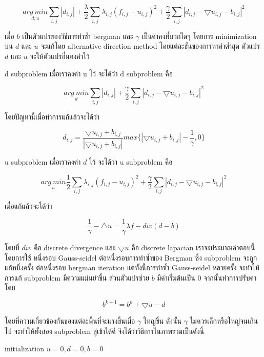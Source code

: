 \documentclass[hidelinks,a4paper,14pt]{article}
\numberwithin{equation}{section}							%
\begin{document}
{		$$\underset{d , u}{arg \ min}\sum_{i,j}|d_{i,j}|+\frac{\lambda}{2}\sum_{i,j}\lambda_{i,j}(f_{i,j} - u_{i,j})^2 + \frac{\gamma}{2} \sum_{i,j} |d_{i,j} - \bigtriangledown u_{i,j}- b_{i,j}|^2 $$
		
		เมื่อ $b$  เป็นตัวแปรของวิธีการทำซ้ำ bergman และ $\gamma$ เป็นค่าคงที่บวกใดๆ โดยการ minimization  บน $d$ และ $u$  จะแก้โดย alternative direction method โดยแต่ละขั้นของการหาค่าต่ำสุด ตัวแปร $d$ และ $u$ จะให้ตัวแปรอื่นคงค่าไว้
		
		d subproblem เมื่อเราคงค่า u ไว้ จะได้ว่า d subproblem คือ
		
		$$ \underset{d}{arg \ min} \sum_{i,j} |d_{i,j}| + \frac{\gamma}{2} \sum_{i,j}|d_{i,j} - \bigtriangledown u_{i,j} - b_{i,j}|^2$$
		
		โดยปัญหานี้เมื่อทำการแก้แล้วจะได้ว่า 
		
		$$ d_{i,j} = \frac{\bigtriangledown u_{i,j}  + b_{i,j} }{ | \bigtriangledown u_{i,j}  + b_{i,j} | } max \{  | \bigtriangledown u_{i,j}  + b_{i,j} | - \frac{1}{\gamma} , 0\} $$
		
		u subproblem เมื่อเราคงค่า $d$ ไว้ จะได้ว่า u subproblem คือ
		
		$$ \underset{u}{arg \ min} \frac{1}{2} \sum_{i,j} \lambda_{i,j}  (f_{i,j} - u_{i,j})^2 + \frac{\gamma}{2} \sum_{i,j} |d_{i,j} - \bigtriangledown u_{i,j} - b_{i,j}|^2$$
		
		เมื่อแก้แล้วจะได้ว่า
		
		$$ \frac{1}{\gamma} - \bigtriangleup u = \frac{1}{\gamma} \lambda f - div (d-b)$$
		
		โดยที่ $div$ คือ discrete divergence และ $\bigtriangledown u$ คือ discrete lapacian เราจะประมาณคำตอบนี้โดยการใช้ หนึ่งรอบ Gauss-seidel ต่อหนึ่งรอบการทำซ้ำของ Bergman ซึ่ง subproblem จะถูกแก้หนึ่งครั้ง ต่อหนึ่งรอบ bergman iteration แต่ทั้งนี้การทำซ้ำ Gauss-seidel หลายครั้ง จะทำให้การแก้ subproblem มีความแม่นยำขึ้น
		ส่วนตัวแปรช่วย $b$ มีค่าเริ่มต้นเป็น 0 จากนั้นทำการปรับค่าโดย
		
		$$ b^{k+1} = b^k  + \bigtriangledown u - d $$
		
		โดยที่ความเกี่ยวข้องกันของแต่ละพื้นที่จะแรงขึ้นเมื่อ $\gamma$ ใหญ่ขึ้น ดังนั้น $\gamma$ ไม่ควรเล็กหรือใหญ่จนเกินไป จะทำให้ทั้งสอง subproblem ลู่เข้าได้ดี
		จึงได้ว่าวิธีการในภาพรวมเป็นดังนี้
		
		
		
		\begin{algorithm}[H]
			\begin{framed}
				initialization $u = 0, d = 0, b = 0$\\
			\end{framed}
		\end{algorithm}
		
}
\end{document}
